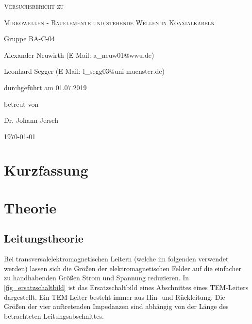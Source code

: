 \documentclass[
	a4paper,
	12pt,
	pagesize,
	ngerman
]{scrartcl}
\begin{document}
	\begin{titlepage}
		\centering
		{\scshape\LARGE Versuchsbericht zu \par}
		\vspace{1cm}
		{\scshape\huge Mirkowellen - Bauelemente und stehende Wellen in Koaxialkabeln \par}
		\vspace{2.5cm}
		{\LARGE Gruppe BA-C-04 \par}
		\vspace{0.5cm}

		{\large Alexander Neuwirth (E-Mail: a\_neuw01@wwu.de) \par}
		{\large Leonhard Segger (E-Mail: l\_segg03@uni-muenster.de) \par}
		\vfill

		durchgeführt am 01.07.2019\par
		betreut von\par
		{\large Dr. Johann Jersch} %

		\vfill

		{\large \today\par}
	\end{titlepage}
	\tableofcontents
	\newpage


	\section{Kurzfassung}

  \section{Theorie}


	\subsection{Leitungstheorie} %

	Bei transversalelektromagnetischen Leitern (welche im folgenden verwendet werden) lassen sich die Größen der elektromagnetischen Felder auf die einfacher zu handhabenden Größen Strom und Spannung reduzieren.
	In \cref{fig_ersatzschaltbild} ist das Ersatzschaltbild eines Abschnittes eines TEM-Leiters dargestellt.
	Ein TEM-Leiter besteht immer aus Hin- und Rückleitung.
	Die Größen der vier auftretenden Impedanzen sind abhängig von der Länge des betrachteten Leitungsabschnittes.
\end{document}
